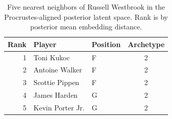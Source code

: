\begin{table}[htbp]
  \centering\small
  \begin{tabular}{rllc}
    \toprule
    Rank & Player & Position & Archetype \\
    \midrule
    1 & Toni Kukoc & F & 2 \\
    2 & Antoine Walker & F & 2 \\
    3 & Scottie Pippen & F & 2 \\
    4 & James Harden & G & 2 \\
    5 & Kevin Porter Jr. & G & 2 \\
    \bottomrule
  \end{tabular}
  \caption{Five nearest neighbors of Russell Westbrook in the Procrustes-aligned posterior latent space. Rank is by posterior mean embedding distance.}
  \label{tab:Russell_Westbrook_neighbors}
\end{table}

